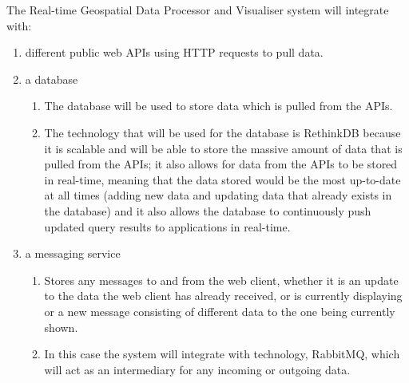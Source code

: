 The Real-time Geospatial Data Processor and Visualiser system will integrate with:
	\begin{enumerate}
		\item different public web APIs using HTTP requests to pull data.
		\item a database
			\begin{enumerate}
				\item The database will be used to store data which is pulled from the APIs.
				\item The technology that will be used for the database is RethinkDB because it is scalable and will be able to store the massive amount of data that is pulled from the APIs; it also allows for data from the APIs to be stored in real-time, meaning that the data stored would be the most up-to-date at all times (adding new data and updating data that already exists in the database) and it also allows the database to continuously push updated query results to applications in real-time. 
			\end{enumerate}
		\item a messaging service
			\begin{enumerate}
				\item Stores any messages to and from the web client, whether it is an update to the data the web client has already received, or is currently displaying or a new message consisting of different data to the one being currently shown.
				\item In this case the system will integrate with technology, RabbitMQ, which will act as an intermediary for any incoming or outgoing data. 
			\end{enumerate}
	\end{enumerate}
